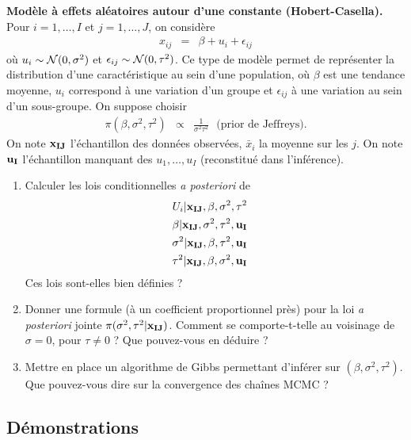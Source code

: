 \documentclass[10pt]{article}
\begin{document}
\if{} \vspace{1cm}
\begin{exec}{\bf Modèle à effets aléatoires autour d'une constante  (Hobert-Casella).}
Pour $i=1,\ldots,I$ et $j=1,\ldots,J$, on considère 
\begin{eqnarray*}
x_{ij} &  = & \beta + u_i + \epsilon_{ij}
\end{eqnarray*}
où $u_i\sim {\cal{N}}(0,\sigma^2)$ et $\epsilon_{ij}\sim {\cal{N}}(0,\tau^2)$. Ce type de modèle permet de représenter la distribution d'une caractéristique au sein d'une population, où  $\beta$ est une tendance moyenne, $u_i$ correspond à une  variation d'un groupe et $\epsilon_{ij}$ à une  variation au sein d'un sous-groupe. On suppose choisir 
\begin{eqnarray*}
\pi(\beta,\sigma^2,\tau^2) & \propto & \frac{1}{\sigma^2\tau^2} \ \ \ \text{(prior de Jeffreys)}.
\end{eqnarray*}
On note ${\bf x_{IJ}}$ l'échantillon des données observées, $\bar{x}_i$ la moyenne sur les $j$. On note ${\bf u_I}$ l'échantillon manquant des $u_1,\ldots,u_I$ (reconstitué dans l'inférence). 
\begin{enumerate}
    \item Calculer les lois conditionnelles {\it a posteriori} de 
\begin{eqnarray*}
U_i|{\bf x_{IJ}},\beta,\sigma^2,\tau^2 &  &  \\
\beta|{\bf x_{IJ}},\sigma^2,\tau^2,{\bf u_I} &  &  \\
\sigma^2|{\bf x_{IJ}},\beta,\tau^2,{\bf u_I} &  &  \\
\tau^2|{\bf x_{IJ}},\beta,\sigma^2,{\bf u_I} & & 
\end{eqnarray*}
Ces lois sont-elles bien définies ?
\item Donner une formule (à un coefficient proportionnel près) pour la loi {\it a posteriori} jointe $\pi(\sigma^2,\tau^2|{\bf x_{IJ}})$. Comment se comporte-t-telle au voisinage de $\sigma=0$, pour $\tau\neq 0$ ? Que pouvez-vous en déduire ? 
\item Mettre en place un algorithme de Gibbs permettant d'inférer sur $(\beta,\sigma^2,\tau^2)$. 
Que pouvez-vous dire sur la convergence des chaînes MCMC ?
\end{enumerate}
\end{exec}

 
\fi

\clearpage 
\subsection{Démonstrations}
\end{document}
